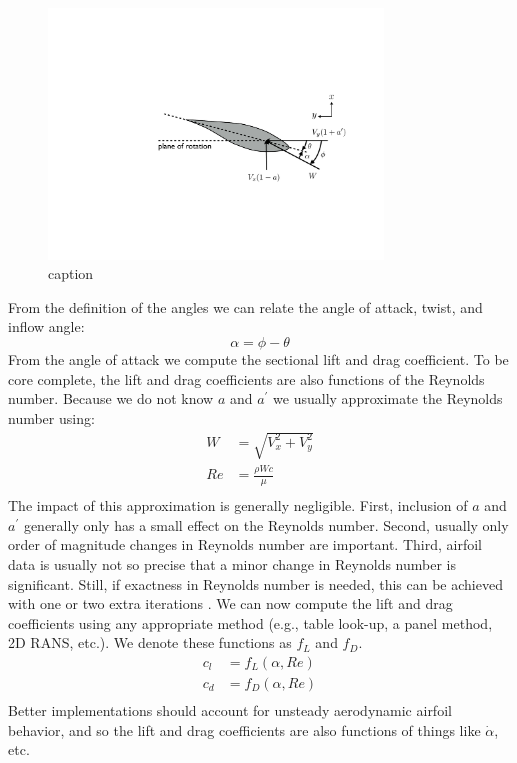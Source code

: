 \documentclass{article}
\begin{document}
\begin{figure}[htbp]
\centering
\includegraphics[width=3.5in]{figures/inflow2}
\caption{caption}
\label{fig:inflow2}
\end{figure}

From the definition of the angles we can relate the angle of attack, twist, and inflow angle:
\begin{equation}
    \alpha = \phi - \theta
    \label{eq:aoa}
\end{equation}
From the angle of attack we compute the sectional lift and drag coefficient.  To be core complete, the lift and drag coefficients are also functions of the Reynolds number.  Because we do not know $a$ and $a^\prime$ we usually approximate the Reynolds number using:
\begin{equation}
    \begin{aligned}
        W &= \sqrt{V_x^2 + V_y^2}\\
        Re &= \frac{\rho W c}{\mu}\\
    \end{aligned}
\end{equation}
The impact of this approximation is generally negligible.  First, inclusion of $a$ and $a^\prime$ generally only has a small effect on the Reynolds number.  Second, usually only order of magnitude changes in Reynolds number are important.  Third, airfoil data is usually not so precise that a minor change in Reynolds number is significant.  Still, if exactness in Reynolds number is needed, this can be achieved with one or two extra iterations \cite{Ning2014-Simple-Solution}.  We can now compute the lift and drag coefficients using any appropriate method (e.g., table look-up, a panel method, 2D RANS, etc.).  We denote these functions as $f_L$ and $f_D$.
\begin{equation}
    \begin{aligned}
        c_l &= f_L(\alpha, Re)\\
        c_d &= f_D(\alpha, Re)\\
    \end{aligned}
\end{equation}
Better implementations should account for unsteady aerodynamic airfoil behavior, and so the lift and drag coefficients are also functions of things like $\dot{\alpha}$, etc.
\end{document}
